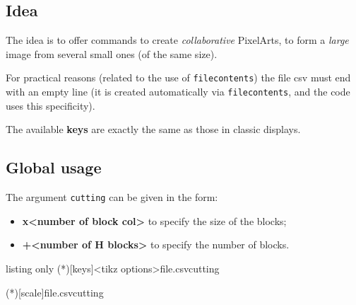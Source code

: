 \documentclass{article}
\newcommand\Cle[1]{{\bfseries\sffamily\textlangle #1\textrangle}}
\begin{document}
\subsection{Idea}

The idea is to offer commands to create \textit{collaborative} PixelArts, to form a \textit{large} image from several small ones (of the same size).

\smallskip

{\footnotesize\faBomb} For practical reasons (related to the use of \texttt{filecontents}) the file \textsf{csv} must end with an empty line (it is created automatically via \texttt{filecontents}, and the code uses this specificity).

\smallskip

The available \Cle{keys} are exactly the same as those in classic displays.

\subsection{Global usage}

The argument \texttt{cutting} can be given in the form:
%
\begin{itemize}
	\item \Cle{<number of block length>x<number of block col>} to specify the size of the blocks;
	\item \Cle{<number of V blocks>+<number of H blocks>} to specify the number of blocks.
\end{itemize}

\begin{PresentationCode}{listing only}
\CutPixlArtTikz(*)[keys]<tikz options>{file.csv}{cutting}

\HelpGridPixelArtTikz(*)[scale]{file.csv}{cutting}
\end{PresentationCode}
\end{document}
